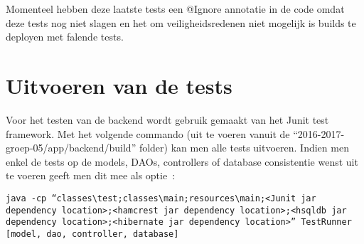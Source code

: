 \documentclass{article}
\begin{document}
Momenteel hebben deze laatste tests een @Ignore annotatie in de code omdat deze tests nog niet slagen en het om veiligheidsredenen niet mogelijk is builds te deployen met falende tests.

\section{Uitvoeren van de tests}
Voor het testen van de backend wordt gebruik gemaakt van het Junit test framework. Met het volgende commando (uit te voeren vanuit de "`2016-2017-groep-05/app/backend/build"' folder) kan men alle tests uitvoeren. Indien men enkel de tests op de models, DAOs, controllers of database consistentie wenst uit te voeren geeft men dit mee als optie~:\\
\begin{center}
	\texttt{java -cp "`classes\textbackslash test;classes\textbackslash main;resources\textbackslash main;<Junit jar dependency location>;<hamcrest jar dependency location>;<hsqldb jar dependency location>;<hibernate jar dependency location>"' TestRunner [model, dao, controller, database]}
\end{center}
\end{document}
